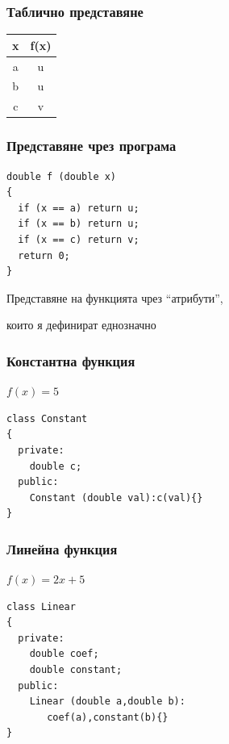 \documentclass{beamer}
\begin{document}
\begin{frame}[fragile]
\frametitle{Таблично представяне}

\begin{center}
\begin{tabular}{c | c}
x & f(x) \\\hline
a & u \\
b & u \\
c & v
\end{tabular}
  
\end{center}


\end{frame}


\begin{frame}[fragile]
\frametitle{Представяне чрез програма}

\begin{center}
\begin{lstlisting}
double f (double x)
{
  if (x == a) return u;
  if (x == b) return u;
  if (x == c) return v;
  return 0;
}
\end{lstlisting}
  
\end{center}


\end{frame}


\begin{frame}
\centerline{Представяне на функцията чрез ``атрибути'',}
\centerline{които я дефинират еднозначно}
\end{frame}


\begin{frame}[fragile]
\frametitle{Константна функция}

\begin{center}

$f(x) = 5$

\begin{lstlisting}
class Constant
{
  private:
    double c;
  public:
    Constant (double val):c(val){}
}
\end{lstlisting}
  
\end{center}


\end{frame}


\begin{frame}[fragile]
\frametitle{Линейна функция}

\begin{center}

$f(x) = 2x + 5$

\begin{lstlisting}
class Linear
{
  private:
    double coef;
    double constant;
  public:
    Linear (double a,double b):
       coef(a),constant(b){}
}
\end{lstlisting}
  
\end{center}


\end{frame}
\end{document}
